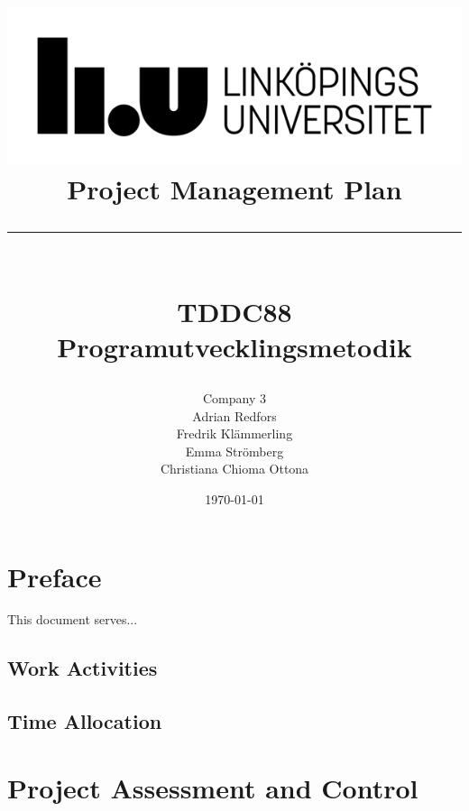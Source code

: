 \documentclass{article}
\title{
    \includegraphics[scale=1.5]{liu_logga.png} \\
    \vspace{2.0cm}
    \textbf{Project Management Plan} \\
    \rule{\textwidth}{0.4pt} \\
    \large \textbf{TDDC88 Programutvecklingsmetodik}
}
\author{Company 3 \\Adrian Redfors \\ Fredrik Klämmerling \\ Emma Strömberg \\ Christiana Chioma Ottona }
\date{\today}
\begin{document}
\maketitle

\newpage
 
\newpage


\tableofcontents
\newpage


\section*{Preface}
This document serves...

\newpage

\subsection{Work Activities}
\lipsum[1]

\subsection{Time Allocation}
\lipsum[1]

\section{Project Assessment and Control}
\lipsum[1]
\end{document}
